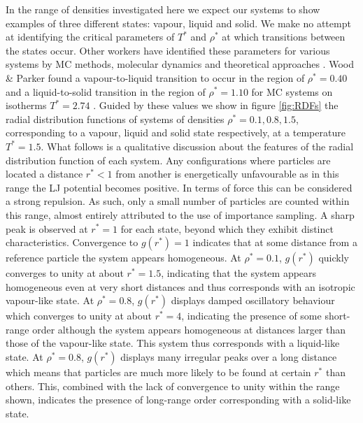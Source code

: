 \documentclass[10pt, twocolumn]{revtex4}    %
\begin{document}
In the range of densities investigated here we expect our systems to show examples of three different states: vapour, liquid and solid. We make no attempt at identifying the critical parameters of $T^{*}$ and $\rho{}^{*}$ at which transitions between the states occur. Other workers have identified these parameters for various systems by MC methods, molecular dynamics and theoretical approaches \cite{Ree}. Wood \& Parker found a vapour-to-liquid transition to occur in the region of $\rho{}^{*}=0.40$ and a liquid-to-solid transition in the region of $\rho{}^{*}=1.10$ for MC systems on isotherms $T^{*}=2.74$ \cite{WoodParker}. Guided by these values we show in figure \ref{fig:RDFs} the radial distribution functions of systems of densities $\rho{}^{*}=0.1, 0.8, 1.5$, corresponding to a vapour, liquid and solid state respectively, at a temperature $T^{*}=1.5$. What follows is a qualitative discussion about the features of the radial distribution function of each system.
Any configurations where particles are located a distance $r^{*}<1$ from another is energetically unfavourable as in this range the LJ potential becomes positive. In terms of force this can be considered a strong repulsion. As such, only a small number of particles are counted within this range, almost entirely attributed to the use of importance sampling.
A sharp peak is observed at $r^{*}=1$ for each state, beyond which they exhibit distinct characteristics. Convergence to $g(r^{*}) = 1$ indicates that at some distance from a reference particle the system appears homogeneous.  At $\rho{}^{*}=0.1$, $g(r^{*})$ quickly converges to unity at about $r^{*}=1.5$, indicating that the system appears homogeneous even at very short distances and thus corresponds with an isotropic vapour-like state. At $\rho{}^{*}=0.8$, $g(r^{*})$ displays damped oscillatory behaviour which converges to unity at about $r^{*}=4$, indicating the presence of some short-range order although the system appears homogeneous at distances larger than those of the vapour-like state. This system thus corresponds with a liquid-like state. At $\rho{}^{*}=0.8$, $g(r^{*})$ displays many irregular peaks over a long distance which means that particles are much more likely to be found at certain $r^{*}$ than others. This, combined with the lack of convergence to unity within the range shown, indicates the presence of long-range order corresponding with a solid-like state.
\end{document}
